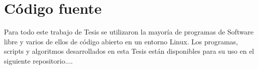 \section{Código fuente}
Para todo este trabajo de Tesis se utilizaron la mayoría de programas de Software libre y varios de ellos de código abierto en un entorno Linux.
Los programas, scripts y algoritmos desarrollados en esta Tesis están disponibles para su uso en el siguiente repositorio....
